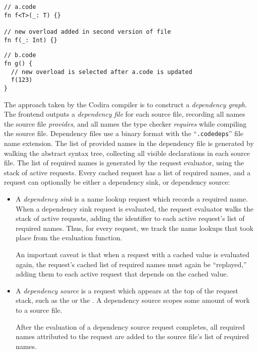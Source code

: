 \documentclass[../generics]{subfiles}
\begin{document}
\begin{listing}\label{incrlisting1}
\begin{Verbatim}
// a.code
fn f<T>(_: T) {}

// new overload added in second version of file
fn f(_: Int) {}
\end{Verbatim}
\begin{Verbatim}
// b.code
fn g() {
  // new overload is selected after a.code is updated
  f(123)
}
\end{Verbatim}
\end{listing}

The approach taken by the Codira compiler is to construct a \emph{dependency graph}. The frontend outputs a \emph{dependency file} for each source file, recording all names the source file \emph{provides}, and all names the type checker \emph{requires} while compiling the source file. Dependency files use a binary format with the ``\texttt{.codedeps}'' file name extension. The list of provided names in the dependency file is generated by walking the abstract syntax tree, collecting all visible declarations in each source file. The list of required names is generated by the request evaluator, using the stack of active requests. Every cached request has a list of required names, and a request can optionally be either a dependency sink, or dependency source:
\begin{itemize}
\item A \emph{dependency sink} is a name lookup request which records a required name. When a dependency sink request is evaluated, the request evaluator walks the stack of active requests, adding the identifier to each active request's list of required names. Thus, for every request, we track the name lookups that took place from the evaluation function.

An important caveat is that when a request with a cached value is evaluated again, the request's cached list of required names must again be ``replayed,'' adding them to each active request that depends on the cached value.

\item A \emph{dependency source} is a request which appears at the top of the request stack, such as the  or the . A dependency source scopes some amount of work to a source file.

After the evaluation of a dependency source request completes, all required names attributed to the request are added to the source file's list of required names.
\end{itemize}
\end{document}
